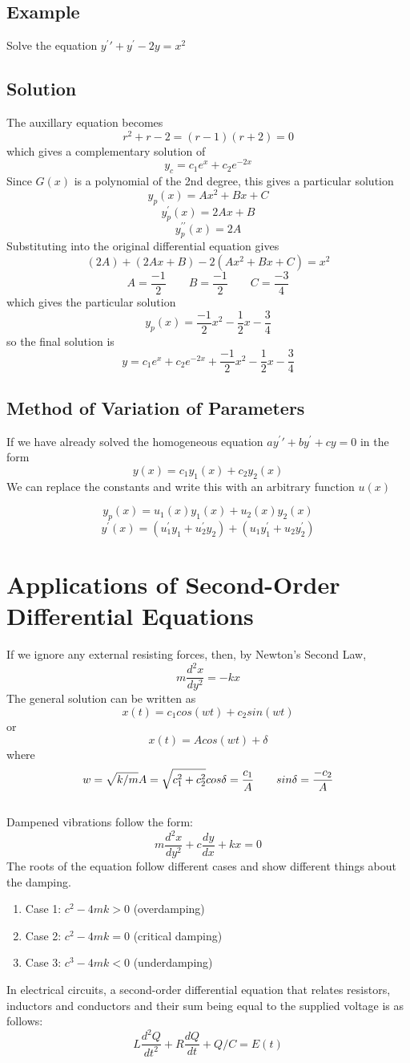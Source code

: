 \subsection*{Example}
Solve the equation $y^\prime\prime + y^\prime - 2y = x^2$

\subsection*{Solution}
The auxillary equation becomes
$$r^2+r-2 = (r-1)(r+2) = 0$$
which gives a complementary solution of
$$y_c = c_1e^x + c_2e^{-2x}$$ Since $G(x)$ is a polynomial of the 2nd degree, this gives a particular solution
$$y_p(x) = Ax^2 + Bx + C$$
$$y^\prime_p(x) = 2Ax + B$$ $$y^{\prime\prime}_p(x) = 2A$$
Substituting into the original differential equation gives
$$(2A) + (2Ax + B) - 2 (Ax^2 + Bx + C) = x^2$$ $$A = \frac{-1}{2}\qquad B = \frac{-1}{2}\qquad C = \frac{-3}{4}$$
which gives the particular solution
$$y_p(x) = \frac{-1}{2}x^2 - \frac{1}{2}x - \frac{3}{4}$$
so the final solution is
$$y = c_1e^x + c_2e^{-2x} + \frac{-1}{2}x^2 - \frac{1}{2}x - \frac{3}{4}$$

\subsection*{Method of Variation of Parameters}
If we have already solved the homogeneous equation $ay^\prime\prime + by^\prime + cy = 0$ in the form
$$y(x) = c_1y_1(x) + c_2y_2(x)$$We can replace the constants and write this with an arbitrary function $u(x)$

$$y_p(x) = u_1(x)y_1(x) + u_2(x)y_2(x)$$ $$y^\prime(x) = (u^\prime_1y_1 + u^\prime_2y_2) + (u_1y^\prime_1 + u_2y^\prime_2)$$

\section*{Applications of Second-Order Differential Equations}
If we ignore any external resisting forces, then, by Newton's Second Law, 
$$m\frac{d^2x}{dy^2} = -kx$$ The general solution can be written as
$$x(t) = c_1cos(wt) + c_2sin(wt)$$ or $$x(t) = Acos(wt)+\delta$$ where
$$w = \sqrt{k/m}\\A = \sqrt{c^2_1 + c^2_2}\\cos\delta = \frac{c_1}{A}\qquad sin\delta = \frac{-c_2}{A}$$\\
Dampened vibrations follow the form:
$$m\frac{d^2x}{dy^2} + c\frac{dy}{dx} + kx = 0$$
The roots of the equation follow different cases and show different things about the damping.
\begin{enumerate}
    \item Case 1: $c^2 - 4mk > 0$ (overdamping)
    \item Case 2: $c^2 - 4mk = 0$ (critical damping)
    \item Case 3: $c^3 - 4mk < 0$ (underdamping)
\end{enumerate}
In electrical circuits, a second-order differential equation that relates resistors, inductors and conductors and their sum being equal to the supplied voltage is as follows:
$$L\frac{d^2Q}{dt^2} + R\frac{dQ}{dt} + Q/C = E(t)$$

